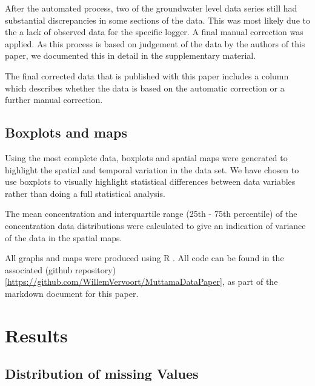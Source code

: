 \documentclass[, manuscript]{copernicus}
\begin{document}
After the automated process, two of the groundwater level data series
still had substantial discrepancies in some sections of the data. This
was most likely due to the a lack of observed data for the specific
logger. A final manual correction was applied. As this process is based
on judgement of the data by the authors of this paper, we documented
this in detail in the supplementary material.

The final corrected data that is published with this paper includes a
column which describes whether the data is based on the automatic
correction or a further manual correction.

\subsection{Boxplots and maps}

Using the most complete data, boxplots and spatial maps were generated
to highlight the spatial and temporal variation in the data set. We have
chosen to use boxplots to visually highlight statistical differences
between data variables rather than doing a full statistical analysis.

The mean concentration and interquartile range (25th - 75th percentile)
of the concentration data distributions were calculated to give an
indication of variance of the data in the spatial maps.

All graphs and maps were produced using R \citep{R2023}. All code can be
found in the associated (github
repository){[}\url{https://github.com/WillemVervoort/MuttamaDataPaper}{]},
as part of the markdown document for this paper.

\section{Results}

\subsection{Distribution of missing Values}

\clearpage
\end{document}
